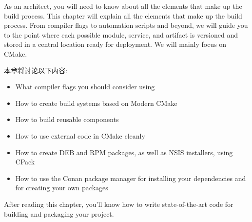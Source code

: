 
As an architect, you will need to know about all the elements that make up the build process. This chapter will explain all the elements that make up the build process. From compiler flags to automation scripts and beyond, we will guide you to the point where each possible module, service, and artifact is versioned and stored in a central location ready for deployment. We will mainly focus on CMake.

本章将讨论以下内容:

\begin{itemize}
\item 
What compiler flags you should consider using

\item 
How to create build systems based on Modern CMake

\item 
How to build reusable components

\item 
How to use external code in CMake cleanly

\item 
How to create DEB and RPM packages, as well as NSIS installers, using CPack

\item 
How to use the Conan package manager for installing your dependencies and for creating your own packages
\end{itemize}

After reading this chapter, you'll know how to write state-of-the-art code for building and packaging your project. 